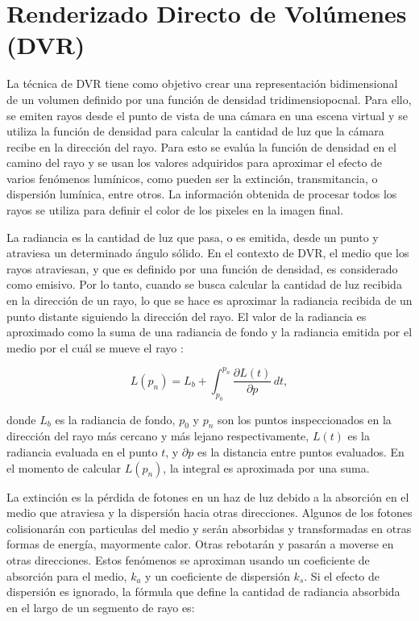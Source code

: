 \documentclass[spanish,a4paper,11pt,oneside,links]{report}
\begin{document}
\section{Renderizado Directo de Volúmenes (DVR)}
La técnica de DVR tiene como objetivo crear una representación bidimensional de un volumen
definido por una función de densidad tridimensiopocnal. Para ello, se emiten rayos desde el punto de vista de una cámara en una escena virtual y se utiliza la función de densidad para calcular la cantidad de luz que la cámara recibe en la dirección del rayo. Para esto se evalúa la función de densidad en el camino del rayo y se usan los valores adquiridos para aproximar el efecto de varios fenómenos lumínicos, como pueden ser la extinción, transmitancia, o dispersión lumínica, entre otros. La información obtenida de procesar todos los rayos se utiliza para definir el color de los pixeles en la imagen final.

La radiancia es la cantidad de luz que pasa, o es emitida, desde un punto y atraviesa un determinado ángulo sólido. En el contexto de DVR, el medio que los rayos atraviesan, y que es definido por una función de densidad, es considerado como emisivo. Por lo tanto, cuando se busca calcular la cantidad de luz recibida en la dirección de un rayo, lo que se hace es aproximar la radiancia recibida de un punto distante siguiendo la dirección del rayo. El valor de la radiancia es aproximado como la suma de una radiancia de fondo y la radiancia emitida por el medio por el cuál se mueve el rayo \cite{Kratz2006} :

\begin{equation} \label{eq:general_radiance}  
  L(p_n) = L_b + \int_{p_0}^{p_n} \frac{\partial L(t)}{\partial p} \, dt,
\end{equation}

\noindent donde $L_b$ es la radiancia de fondo, $p_0$ y $p_n$ son los puntos inspeccionados en la dirección del rayo más cercano y más lejano respectivamente, $L(t)$ es la radiancia evaluada en el punto $t$, y $\partial p$ es la distancia entre puntos evaluados. En el momento de calcular $L(p_n)$, la integral es aproximada por una suma.

La extinción es la pérdida de fotones en un haz de luz debido a la absorción en el medio que atraviesa y la dispersión hacia otras direcciones. Algunos de los fotones colisionarán con particulas del medio y serán absorbidas y transformadas en otras formas de energía, mayormente calor. Otras rebotarán y pasarán a moverse en otras direcciones. Estos fenómenos se aproximan usando un coeficiente de absorción para el medio, $k_a$ y un coeficiente de dispersión $k_s$. Si el efecto de dispersión es ignorado, la fórmula que define la cantidad de radiancia absorbida en el largo de un segmento de rayo
es: 
\end{document}

